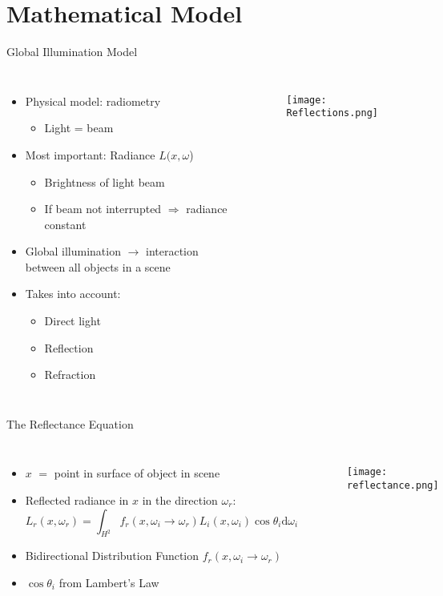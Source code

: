 \section{Mathematical Model}
\begin{frame}{Global Illumination Model}

\begin{columns}
\begin{itemize}
\item<1-> Physical model: radiometry 
\begin{itemize}
\item<1-> Light = beam 
\end{itemize}
\item<2-> Most important: Radiance $L(x, \omega$)
\begin{itemize}
    \item<2-> Brightness of light beam
    \item<2-> If beam not interrupted $\Rightarrow$ radiance constant
\end{itemize}
\item<3-> Global illumination $\rightarrow$ interaction between all objects in a scene 
\item<4-> Takes into account:
\begin{itemize}
    \item<4-> Direct light
    \item<4-> Reflection
    \item<4-> Refraction
\end{itemize}
\end{itemize}
\begin{figure}
\texttt{[image: Reflections.png]}
\end{figure}
\end{columns}

\end{frame}

\begin{frame}{The Reflectance Equation}
\begin{columns}
\begin{itemize}
    \item<1-> $x$ $=$ point in surface of object in scene
    \item<2-> Reflected radiance in $x$ in the direction $\omega_r$: 
    \begin{equation}
L_r(x, \omega_r) = \int_{H^2} f_r(x, \omega_i \rightarrow \omega_r) L_i(x, \omega_i) \cos \theta_i \mathrm{d}\omega_i
\end{equation}
    \item<4-> Bidirectional Distribution Function $f_r(x, \omega_i \rightarrow \omega_r) $
    \item<5-> $\cos \theta_i$ from Lambert's Law
\end{itemize}
\begin{figure}
\texttt{[image: reflectance.png]}
\end{figure}
\end{columns}
\end{frame}

